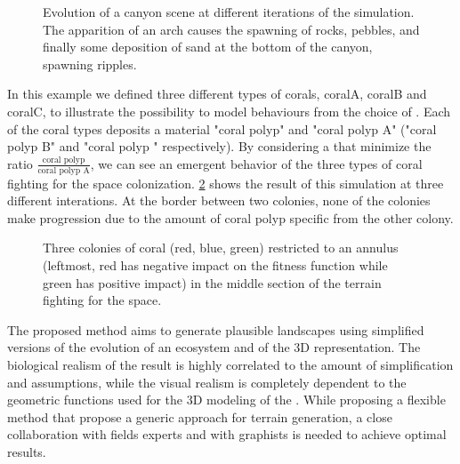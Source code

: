 \begin{figure}
    \caption{Evolution of a canyon scene at different iterations of the simulation. The apparition of an arch causes the spawning of rocks, pebbles, and finally some deposition of sand at the bottom of the canyon, spawning ripples. }
    \label{fig:env-obj-canyon-scene}
\end{figure}

In this example we defined three different types of corals, coralA, coralB and coralC, to illustrate the possibility to model behaviours from the choice of . Each of the coral types deposits a material "coral polyp" and "coral polyp A" ("coral polyp B" and "coral polyp \curve" respectively). By considering a  that minimize the ratio $\frac{\text{coral polyp}}{\text{coral polyp A}}$, we can see an emergent behavior of the three types of coral fighting for the space colonization.
\cref{fig:env-obj-coral-colonization-scene} shows the result of this simulation at three different interations. At the border between two colonies, none of the colonies make progression due to the amount of coral polyp specific from the other colony.

\begin{figure}
    \caption{Three colonies of coral (red, blue, green) restricted to an annulus (leftmost, red has negative impact on the fitness function while green has positive impact) in the middle section of the terrain fighting for the space.}
    \label{fig:env-obj-coral-colonization-scene}
\end{figure}


The proposed method aims to generate plausible landscapes using simplified versions of the evolution of an ecosystem and of the 3D representation. The biological realism of the result is highly correlated to the amount of simplification and assumptions, while the visual realism is completely dependent to the geometric functions used for the 3D modeling of the . While proposing a flexible method that propose a generic approach for terrain generation, a close collaboration with fields experts and with graphists is needed to achieve optimal results.


